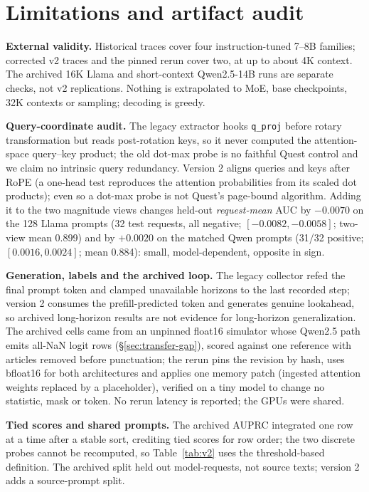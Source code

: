 \section{Limitations and artifact audit}
\label{sec:limits}

\textbf{External validity.} Historical traces cover four instruction-tuned 7--8B
families; corrected v2 traces and the pinned rerun cover two, at up to about 4K
context. The archived 16K Llama and short-context Qwen2.5-14B runs are separate
checks, not v2 replications. Nothing is extrapolated to MoE, base checkpoints, 32K
contexts or sampling; decoding is greedy.

\textbf{Query-coordinate audit.} The legacy extractor hooks \texttt{q\_proj} before
rotary transformation but reads post-rotation keys, so it never computed the
attention-space query--key product; the old dot-max probe is no faithful Quest control
and we claim no intrinsic query redundancy. Version 2 aligns queries and keys after
RoPE (a one-head test reproduces the attention probabilities from its scaled dot
products); even so a dot-max probe is not Quest's page-bound algorithm. Adding it to the two magnitude views changes
held-out \emph{request-mean} AUC by $-0.0070$ on the 128 Llama prompts (32 test
requests, all negative; $[-0.0082,-0.0058]$; two-view mean 0.899) and by $+0.0020$ on
the matched Qwen prompts (31/32 positive; $[0.0016,0.0024]$; mean 0.884): small,
model-dependent, opposite in sign.

\textbf{Generation, labels and the archived loop.} The legacy collector refed the final
prompt token and clamped unavailable horizons to the last recorded step; version 2
consumes the prefill-predicted token and generates genuine lookahead, so archived
long-horizon results are not evidence for long-horizon generalization. The archived cells came from an unpinned float16
simulator whose
Qwen2.5 path emits all-NaN logit rows (\S\ref{sec:transfer-gap}), scored against one
reference with articles removed before punctuation; the rerun pins the revision by hash,
uses bfloat16 for both architectures and applies one memory patch (ingested attention
weights replaced by a placeholder), verified on a tiny model to change no statistic,
mask or token. No rerun latency is reported; the GPUs were shared.

\textbf{Tied scores and shared prompts.} The archived AUPRC integrated one row at a time
after a stable sort, crediting tied scores for row order; the two discrete probes cannot
be recomputed, so Table~\ref{tab:v2} uses the threshold-based definition. The archived
split held out model-requests, not source texts; version 2 adds a source-prompt split.


